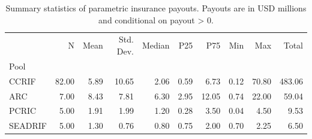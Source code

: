 \begin{table}
\caption{Summary statistics of parametric insurance payouts. Payouts are in USD millions and conditional on payout > 0.}
\label{tab:summary_by_pool}
\begin{tabular}{lrrrrrrrrr}
\toprule
 & N & Mean & Std. Dev. & Median & P25 & P75 & Min & Max & Total \\
Pool &  &  &  &  &  &  &  &  &  \\
\midrule
CCRIF & 82.00 & 5.89 & 10.65 & 2.06 & 0.59 & 6.73 & 0.12 & 70.80 & 483.06 \\
ARC & 7.00 & 8.43 & 7.81 & 6.30 & 2.95 & 12.05 & 0.74 & 22.00 & 59.04 \\
PCRIC & 5.00 & 1.91 & 1.99 & 1.20 & 0.28 & 3.50 & 0.04 & 4.50 & 9.53 \\
SEADRIF & 5.00 & 1.30 & 0.76 & 0.80 & 0.75 & 2.00 & 0.70 & 2.25 & 6.50 \\
\bottomrule
\end{tabular}
\end{table}
